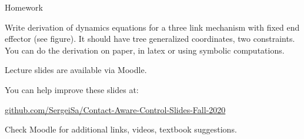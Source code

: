 \documentclass{beamer}
\begin{document}
\begin{frame}{Homework}
\begin{flushleft}

Write derivation of dynamics equations for a three link mechanism with fixed end effector (see figure). It should have tree generalized coordinates, two constraints. You can do the derivation on paper, in latex or using symbolic computations.

\begin{figure}
    \centering
    
\end{figure}

\end{flushleft}
\end{frame}



\begin{frame}
\centerline{Lecture slides are available via Moodle.}
\bigskip
\centerline{You can help improve these slides at:}
\centerline{\href{https://github.com/SergeiSa/Contact-Aware-Control-Slides-Fall-2020}{github.com/SergeiSa/Contact-Aware-Control-Slides-Fall-2020}}
\bigskip
\centerline{Check Moodle for additional links, videos, textbook suggestions.}
\end{frame}
\end{document}
